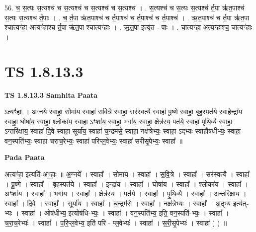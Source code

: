 \documentclass[17pt]{extarticle}
\begin{document}
56. च॒ स॒त्यः स॒त्यश्च॑ च स॒त्यश्च॑ च स॒त्यश्च॑ च स॒त्यश्च॑ । . स॒त्यश्च॑ च स॒त्यः स॒त्यश्च॑ र्त॒पा ऋ॑त॒पाश्च॑ स॒त्यः स॒त्यश्च॑ र्त॒पाः । . च॒ र्त॒पा ऋ॑त॒पाश्च॑ च र्त॒पाश्च॑ च र्त॒पाश्च॑ च र्त॒पाश्च॑ । . ऋ॒त॒पाश्च॑ च र्त॒पा ऋ॑त॒पा श्चात्यꣳ॑हा॒ अत्यꣳ॑हाश्च र्त॒पा ऋ॑त॒पा श्चात्यꣳ॑हाः । . ऋ॒त॒पा इत्यृ॑त - पाः । . चात्यꣳ॑हा॒ अत्यꣳ॑हाश्च॒ चात्यꣳ॑हाः । \newline
\pagebreak
{}

\section{ TS 1.8.13.3 }

\textbf{TS 1.8.13.3 } \newline
\textbf{Samhita Paata} \newline

ऽत्यꣳ॑हाः । अ॒ग्नये॒ स्वाहा॒ सोमा॑य॒ स्वाहा॑ सवि॒त्रे स्वाहा॒ सर॑स्वत्यै॒ स्वाहा॑ पू॒ष्णे स्वाहा॒ बृह॒स्पत॑ये॒ स्वाहेन्द्रा॑य॒ स्वाहा॒ घोषा॑य॒ स्वाहा॒ श्लोका॑य॒ स्वाहा ऽꣳशा॑य॒ स्वाहा॒ भगा॑य॒ स्वाहा॒ क्षेत्र॑स्य॒ पत॑ये॒ स्वाहा॑ पृथि॒व्यै स्वाहा॒ ऽन्तरि॑क्षाय॒ स्वाहा॑ दि॒वे स्वाहा॒ सूर्या॑य॒ स्वाहा॑ च॒न्द्रम॑से॒ स्वाहा॒ नक्ष॑त्रेभ्यः॒ स्वाहा॒ ऽद्भ्यः स्वाहौष॑धीभ्यः॒ स्वाहा॒ वन॒स्पति॑भ्यः॒ स्वाहा॑ चराच॒रेभ्यः॒ स्वाहा॑ परिप्ल॒वेभ्यः॒ स्वाहा॑ सरीसृ॒पेभ्यः॒ स्वाहा᳚ ॥ \newline

\textbf{Pada Paata} \newline

अत्यꣳ॑हा॒ इत्यति॑-अꣳ॒॒हाः॒ ॥ अ॒ग्नये᳚ । स्वाहा᳚ । सोमा॑य । स्वाहा᳚ । स॒वि॒त्रे । स्वाहा᳚ । सर॑स्वत्यै । स्वाहा᳚ । पू॒ष्णे । स्वाहा᳚ । बृह॒स्पत॑ये । स्वाहा᳚ । इन्द्रा॑य । स्वाहा᳚ । घोषा॑य । स्वाहा᳚ । श्लोका॑य । स्वाहा᳚ । अꣳशा॑य । स्वाहा᳚ । भगा॑य । स्वाहा᳚ । क्षेत्र॑स्य । पत॑ये । स्वाहा᳚ । पृ॒थि॒व्यै । स्वाहा᳚ । अ॒न्तरि॑क्षाय । स्वाहा᳚ । दि॒वे । स्वाहा᳚ । सूर्या॑य । स्वाहा᳚ । च॒न्द्रम॑से । स्वाहा᳚ । नक्ष॑त्रेभ्यः । स्वाहा᳚ । अ॒द्भ्य इत्य॑त्-भ्यः । स्वाहा᳚ । ओष॑धीभ्य॒ इत्योष॑धि-भ्यः॒ । स्वाहा᳚ । वन॒स्पति॑भ्य॒ इति॒ वन॒स्पति॑-भ्यः॒ । स्वाहा᳚ । च॒रा॒च॒रेभ्यः॑ । स्वाहा᳚ । प॒रि॒प्ल॒वेभ्य॒ इति॑ परि - प्ल॒वेभ्यः॑ । स्वाहा᳚ । स॒री॒सृ॒पेभ्यः॑ । स्वाहा᳚ ( ) ॥  \newline
\end{document}
